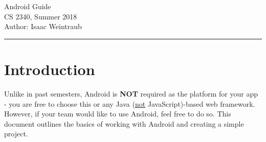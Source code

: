 \documentclass{article}
\begin{document}
\begin{center}
{\huge Android Guide}\\[0.5 cm]
{\large CS 2340, Summer 2018}\\[0.2 cm]
{\large Author: Isaac Weintraub}\\[0.2 cm]
\end{center}
\tableofcontents
\vspace{12mm}
\hrule
\vspace{6mm}

\section{Introduction}
Unlike in past semesters, Android is \textbf{NOT} required as the platform for your app - you are free to choose this or any Java (\underline{not} JavaScript)-based web framework. However, if your team would like to use Android, feel free to do so. This document outlines the basics of working with Android and creating a simple project.
\end{document}

